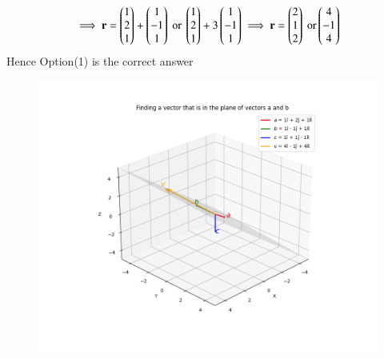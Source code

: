 \documentclass[journal]{IEEEtran}
\begin{document}
\begin{align}
\implies \vec{r}=\myvec{1\\2\\1}+\myvec{1\\-1\\1}\ \text{or}\ \myvec{1\\2\\1}+3\myvec{1\\-1\\1}
\implies \vec{r}=\myvec{2\\1\\2}\ \text{or} \myvec{4\\-1\\4}
\end{align}
Hence Option(1) is the correct answer

\begin{figure}[h!]
   \centering
   \includegraphics[width=0.7\columnwidth]{figs/fig1.png}
   \caption{}
   \label{Figure}
\end{figure}
\end{document}
